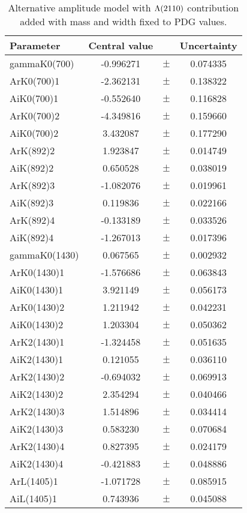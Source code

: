 \clearpage

\begin{table}
\centering
\caption{Alternative amplitude model with ${\Lambda}(2110)$ contribution added with mass and width fixed to PDG values.}
\begin{tiny}
\begin{tabular}{lccc}
\toprule
Parameter & Central value & & Uncertainty\\
\midrule 
gammaK0(700) & -0.996271 & $\pm$ & 0.074335 \\
ArK0(700)1 & -2.362131 & $\pm$ & 0.138322 \\
AiK0(700)1 & -0.552640 & $\pm$ & 0.116828 \\
ArK0(700)2 & -4.349816 & $\pm$ & 0.159660 \\
AiK0(700)2 & 3.432087 & $\pm$ & 0.177290 \\
ArK(892)2 & 1.923847 & $\pm$ & 0.014749 \\
AiK(892)2 & 0.650528 & $\pm$ & 0.038019 \\
ArK(892)3 & -1.082076 & $\pm$ & 0.019961 \\
AiK(892)3 & 0.119836 & $\pm$ & 0.022166 \\
ArK(892)4 & -0.133189 & $\pm$ & 0.033526 \\
AiK(892)4 & -1.267013 & $\pm$ & 0.017396 \\
gammaK0(1430) & 0.067565 & $\pm$ & 0.002932 \\
ArK0(1430)1 & -1.576686 & $\pm$ & 0.063843 \\
AiK0(1430)1 & 3.921149 & $\pm$ & 0.056173 \\
ArK0(1430)2 & 1.211942 & $\pm$ & 0.042231 \\
AiK0(1430)2 & 1.203304 & $\pm$ & 0.050362 \\
ArK2(1430)1 & -1.324458 & $\pm$ & 0.051635 \\
AiK2(1430)1 & 0.121055 & $\pm$ & 0.036110 \\
ArK2(1430)2 & -0.694032 & $\pm$ & 0.069913 \\
AiK2(1430)2 & 2.354294 & $\pm$ & 0.040466 \\
ArK2(1430)3 & 1.514896 & $\pm$ & 0.034414 \\
AiK2(1430)3 & 0.583230 & $\pm$ & 0.070684 \\
ArK2(1430)4 & 0.827395 & $\pm$ & 0.024179 \\
AiK2(1430)4 & -0.421883 & $\pm$ & 0.048886 \\
ArL(1405)1 & -1.071728 & $\pm$ & 0.085915 \\
AiL(1405)1 & 0.743936 & $\pm$ & 0.045088 \\

\end{tabular}
\end{tiny}
\end{table}
